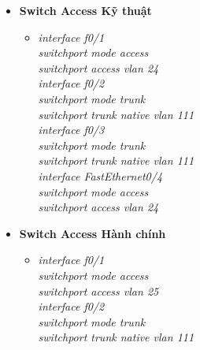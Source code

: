 \documentclass[a4paper, 12pt]{article}
\begin{document}
\begin{itemize}
\begin{itemize}
\begin{itemize}
    \end{itemize}
     \item \textbf{Switch Access Kỹ thuật}
     \begin{itemize}
      \item \textit{interface f0/1\\
                    switchport mode access\\
                    switchport access vlan 24\\
                    interface f0/2\\
                    switchport mode trunk\\
                    switchport trunk native vlan 111\\
                    interface f0/3\\
                    switchport mode trunk\\
                    switchport trunk native vlan 111\\
                    interface FastEthernet0/4\\
                    switchport mode access\\
                     switchport access vlan 24}
     
    \end{itemize}
     \item \textbf{Switch Access Hành chính}
     \begin{itemize}
      \item \textit{interface f0/1\\
                    switchport mode access\\
                    switchport access vlan 25\\
                    interface f0/2\\
                    switchport mode trunk\\
                    switchport trunk native vlan 111}
                         
    \end{itemize}
   \end{itemize}
\end{itemize}
\end{document}
